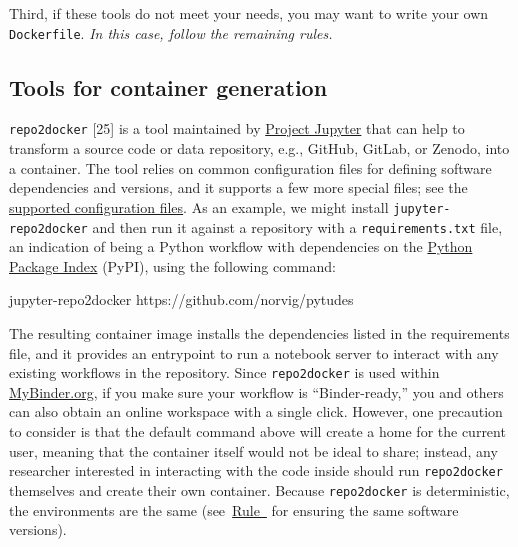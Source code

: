 \documentclass[10pt,letterpaper]{article}
\newenvironment{Shaded}{\begin{snugshade}}{\end{snugshade}}
\newcommand{\ExtensionTok}[1]{#1}
\newcommand{\NormalTok}[1]{#1}
\begin{document}
Third, if these tools do not meet your needs, you may want to write your
own \texttt{Dockerfile}. \emph{In this case, follow the remaining
rules.}

\hypertarget{tools-for-container-generation}{%
\subsection{Tools for container
generation}\label{tools-for-container-generation}}

\texttt{repo2docker} {[}25{]} is a tool maintained by
\href{https://jupyter.org/}{Project Jupyter} that can help to transform
a source code or data repository, e.g., GitHub, GitLab, or Zenodo, into
a container. The tool relies on common configuration files for defining
software dependencies and versions, and it supports a few more special
files; see the
\href{https://repo2docker.readthedocs.io/en/latest/config_files.html}{supported
configuration files}. As an example, we might install
\texttt{jupyter-repo2docker} and then run it against a repository with a
\texttt{requirements.txt} file, an indication of being a Python workflow
with dependencies on the \href{https://pypi.org/}{Python Package Index}
(PyPI), using the following command:

\footnotesize

\begin{Shaded}
\begin{Highlighting}[]
\ExtensionTok{jupyter-repo2docker}\NormalTok{ https://github.com/norvig/pytudes}
\end{Highlighting}
\end{Shaded}

\normalsize

The resulting container image installs the dependencies listed in the
requirements file, and it provides an entrypoint to run a notebook
server to interact with any existing workflows in the repository. Since
\texttt{repo2docker} is used within
\href{https://mybinder.org/}{MyBinder.org}, if you make sure your
workflow is ``Binder-ready,'' you and others can also obtain an online
workspace with a single click. However, one precaution to consider is
that the default command above will create a home for the current user,
meaning that the container itself would not be ideal to share; instead,
any researcher interested in interacting with the code inside should run
\texttt{repo2docker} themselves and create their own container. Because
\texttt{repo2docker} is deterministic, the environments are the same
(see~\hyperref[{rule:pinning}]{Rule~} for
ensuring the same software versions).
\end{document}
